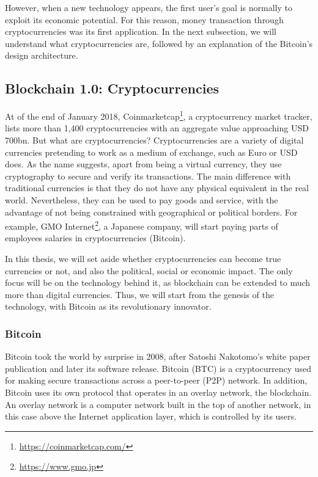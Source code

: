 However, when a new technology appears, the first user's goal is normally to exploit its economic potential. For this reason, money transaction through cryptocurrencies was its first application. In the next subsection, we will understand what cryptocurrencies are, followed by an explanation of the Bitcoin's design architecture.

\subsection{Blockchain 1.0: Cryptocurrencies}

At of the end of January 2018, Coinmarketcap\footnote{\url{https://coinmarketcap.com/}}, a cryptocurrency market tracker, lists more than 1,400 cryptocurrencies with an aggregate value approaching USD 700bn. But what are cryptocurrencies? Cryptocurrencies are a variety of digital currencies pretending to work as a medium of exchange, such as Euro or USD does. As the name suggests, apart from being a virtual currency, they use cryptography to secure and verify its transactions. The main difference with traditional currencies is that they do not have any physical equivalent in the real world. Nevertheless, they can be used to pay goods and service, with the advantage of not being constrained with geographical or political borders. For example, GMO Internet\footnote{\url{https://www.gmo.jp}}, a Japanese company, will start paying parts of employees salaries in cryptocurrencies (Bitcoin).

In this thesis, we will set aside whether cryptocurrencies can become true currencies or not, and also the political, social or economic impact. The only focus will be on the technology behind it, as blockchain can be extended to much more than digital currencies. Thus, we will start from the genesis of the technology, with Bitcoin as its revolutionary innovator.


\subsubsection{Bitcoin}

Bitcoin took the world by surprise in 2008, after Satoshi Nakotomo's white paper publication \cite{nakamoto2008bitcoin} and later its software release. Bitcoin (BTC) is a cryptocurrency used for making secure transactions across a peer-to-peer (P2P) network. In addition, Bitcoin uses its own protocol that operates in an overlay network, the blockchain. An overlay network is a computer network built in the top of another network, in this case above the Internet application layer, which is controlled by its users.

